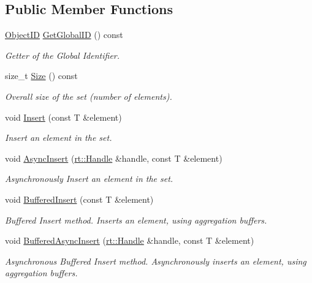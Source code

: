 \subsection*{Public Member Functions}
\begin{DoxyCompactItemize}
\item 
\hyperlink{classshad_1_1Set_a05ba25e24c892602d707b21e3e4300b9}{Object\-I\-D} \hyperlink{classshad_1_1Set_a4c57c459143fba4dc825e77217eb66c7}{Get\-Global\-I\-D} () const 
\begin{DoxyCompactList}\small\item\em Getter of the Global Identifier. \end{DoxyCompactList}\item 
size\-\_\-t \hyperlink{classshad_1_1Set_aefd9d547c7a8a720769e55cafc6802cf}{Size} () const 
\begin{DoxyCompactList}\small\item\em Overall size of the set (number of elements). \end{DoxyCompactList}\item 
void \hyperlink{classshad_1_1Set_a60e9b2e6a7aa74298897867f83851473}{Insert} (const T \&element)
\begin{DoxyCompactList}\small\item\em Insert an element in the set. \end{DoxyCompactList}\item 
void \hyperlink{classshad_1_1Set_a323831242d5737325df067e252c9d5b3}{Async\-Insert} (\hyperlink{classshad_1_1rt_1_1Handle}{rt\-::\-Handle} \&handle, const T \&element)
\begin{DoxyCompactList}\small\item\em Asynchronously Insert an element in the set. \end{DoxyCompactList}\item 
void \hyperlink{classshad_1_1Set_a1ac85f834d9ccd281f56c36742730e97}{Buffered\-Insert} (const T \&element)
\begin{DoxyCompactList}\small\item\em Buffered Insert method. Inserts an element, using aggregation buffers. \end{DoxyCompactList}\item 
void \hyperlink{classshad_1_1Set_a2d3f1919275884a863577853d05c64f2}{Buffered\-Async\-Insert} (\hyperlink{classshad_1_1rt_1_1Handle}{rt\-::\-Handle} \&handle, const T \&element)
\begin{DoxyCompactList}\small\item\em Asynchronous Buffered Insert method. Asynchronously inserts an element, using aggregation buffers. \end{DoxyCompactList}\item 

\end{DoxyCompactItemize}
